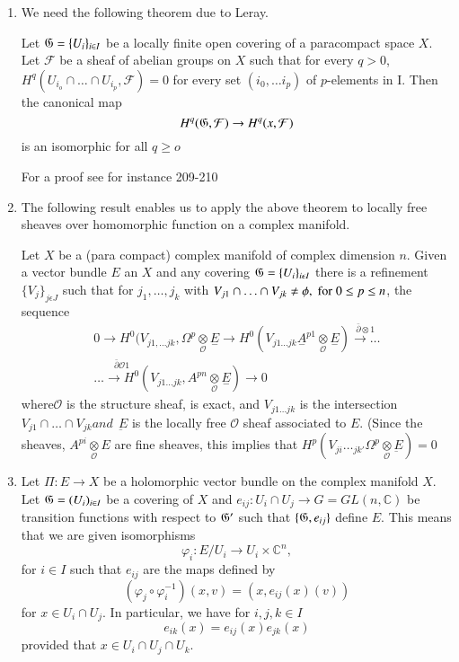 \begin{enumerate}
\item We need the following  theorem  due to Leray.

Let $\mathfrak{G} =\{U_i\}_{i\in I}$ be a locally finite open
covering  of a paracompact space $X$. Let $\mathcal{F}$ be a sheaf of
abelian groups on $X$ such  that for every $q>0$, $H^q(U_{i_o} \cap \ldots \cap
  U_{i_p}, \mathcal{F}) = 0$ for every set $(i_0,\ldots i_p)$ of
  $p$-elements in I. Then the canonical map  
$$
H^q(\mathfrak{G},\mathcal{F})\rightarrow H^q(x,\mathcal{F})
$$
is an isomorphic for all $q\ge o$

For a proof see for instance \cite{key13} 209-210

\item The following result enables us to apply the above theorem to
locally free sheaves over homomorphic function on a complex manifold. 

Let $X$ be a (para compact) complex manifold of complex dimension
$n$. Given a vector bundle $E$ an $X$ and any covering $\mathfrak{G} =
\{U_i\}_{i\epsilon I }$ there is a refinement $\{V_j\}_{j\epsilon J}$
such that for $j_1,\ldots , j_k$ with $V_{j1}\cap\ldots \cap V_{jk}\neq
\phi , \; {\rm for }\; 0 \le p\le n$, the sequence
\begin{multline*}
  0\rightarrow H^0
  (V_{j1,\ldots jk}, \Omega^p \underset{\mathscr{O}}{\otimes} \underset{-}{E}
  \rightarrow  H^0(V_{j1 \ldots jk} \underset{-}{A}^{p1}
  \underset{\mathscr{O}}{\otimes} \underset{-}{E})\overset
  {\bar{\partial} \otimes 1 }{\longrightarrow \ldots}\\
  \ldots \overset{\bar{\partial}\mathscr{O} 1}{\rightarrow H^0} (V_{j1
  \ldots jk}, A^{pn} \underset{\mathscr{O}}{\otimes}
  \underset{-}{E})\rightarrow 0 
\end{multline*}
where\pageoriginale $\mathscr{O}$ is the structure sheaf, is exact, and
$V_{j1 \ldots jk}$ is the intersection $V_{j1} \cap \ldots \cap V_{jk}
and ~~\underbar{E}$ is the  
locally free $\mathscr{O} $ sheaf associated to $E$. (Since the sheaves, $
A^{pi}\underset{\mathscr{O}}{\otimes} E $ are fine sheaves, this implies  
that $H^{p}(V_{ji}\ldots _{jk'}\Omega^{p}\underset{\mathscr{O}}{\otimes}
\underbar{E}) = 0 $ 

\item Let $\Pi : E \rightarrow X $ be a holomorphic vector bundle on the
complex manifold $X$. Let  $\mathfrak{G} = (U_{i})_{i \in I}$ be a covering of $X$
and $e_{ij} : U_{i}\cap U_{j}\rightarrow G = GL(n, \mathbb{C})$ be transition
functions with respect to  
$\mathfrak{G}'$ such that $\{\mathfrak{G},e_{ij}\} $ define $E$. This
means that we are given isomorphisms 
$$
 \varphi_{i} : E/U_{i}\rightarrow U_{i} \times \mathbb{C}^n, 
$$ 
for $i \in I $ such that $ e_{ij} $ are the maps defined by
$$ 
(\varphi_{j}\circ \varphi_{i}^{-1}) (x,v) = (x, e_{ij}(x)(v)) 
$$
for $ x \in U_{i}\cap U_{j}$. In particular, we have for $i, j, k \in I$
$$ 
e_{ik}(x) = e_{ij}(x) e_{jk}(x) 
$$
provided that $ x \in U_{i}\cap U_{j}\cap U_{k}$.


\end{enumerate}
